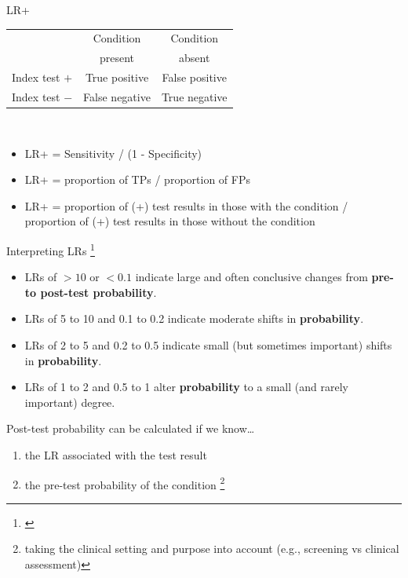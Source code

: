 \documentclass{beamer}
\begin{document}
% 
\begin{frame}{LR+}
\begin{center}
\begin{tabular}{l | c | c }
\toprule
& Condition & Condition \\
& present & absent \\ 
\hline
Index test $+$ & \alert{True positive} & \alert{False positive} \\
\hline
Index test $-$ & False negative & True negative \\
\bottomrule
\end{tabular} \\
\end{center}

\begin{itemize}
	\item LR+ = Sensitivity / (1 - Specificity) 
	\item LR+ = proportion of TPs / proportion of FPs 
	\item LR+ = proportion of  (+) test results in those with the condition / proportion of (+) test results in those without the condition
\end{itemize}
\end{frame}

% 
\begin{frame}{Interpreting LRs \footnote{\tiny{\citet[p. 208]{Guyatt2008d}}}}
	\begin{itemize}
	\item LRs of  $>10$ or $<0.1$ indicate large and often conclusive changes from \textbf{pre- to post-test probability}.
	\item LRs of 5 to 10 and 0.1 to 0.2 indicate moderate shifts in \textbf{probability}.
	\item LRs of  2 to 5 and 0.2 to 0.5 indicate small (but sometimes important) shifts in \textbf{probability}.
	\item LRs of 1 to 2 and 0.5 to 1 alter \textbf{probability} to a small (and rarely important) degree.
	\end{itemize}
\end{frame}

% 
\begin{frame}{Post-test probability can be calculated if we know\dots}
	\begin{enumerate}
	\item the \alert{LR} associated with the test result
	\item the \alert{pre-test probability} of the condition \footnote{\tiny{taking the clinical setting and purpose into account (e.g., screening vs clinical assessment)}}
	\end{enumerate}
\end{frame}
\end{document}

